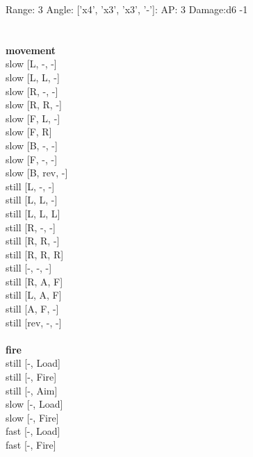 Range: 3  Angle: ['x4', 'x3', 'x3', '-']: AP: 3 Damage:d6 -1 \\




 
\ \\



\ \\ {\bf movement } \\
slow [L, -, -] \\
slow [L, L, -] \\
slow [R, -, -] \\
slow [R, R, -] \\
slow [F, L, -] \\
slow [F, R] \\
slow [B, -, -] \\
slow [F, -, -] \\
slow [B, rev, -] \\
still [L, -, -] \\
still [L, L, -] \\
still [L, L, L] \\
still [R, -, -] \\
still [R, R, -] \\
still [R, R, R] \\
still [-, -, -] \\
still [R, A, F] \\
still [L, A, F] \\
still [A, F, -] \\
still [rev, -, -] \\
\ \\ {\bf fire } \\
still [-, Load] \\
still [-, Fire] \\
still [-, Aim] \\
slow [-, Load] \\
slow [-, Fire] \\
fast [-, Load] \\
fast [-, Fire] \\


